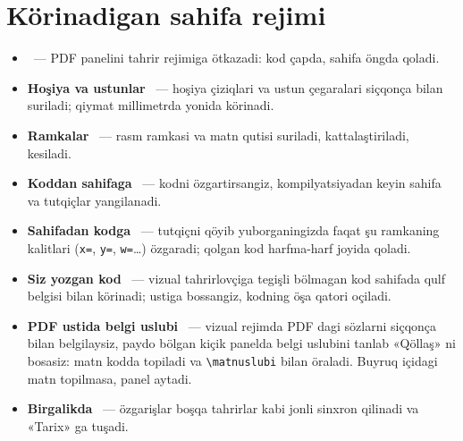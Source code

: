 \section{Körinadigan sahifa rejimi}\label{sec:sd-vizual}
\begin{itemize}
\item \textbf{} \beta\ --- PDF panelini tahrir rejimiga ötkazadi: kod çapda, sahifa öngda qoladi.
\item \textbf{Hoşiya va ustunlar} \beta\ --- hoşiya çiziqlari va ustun çegaralari siçqonça bilan suriladi; qiymat millimetrda yonida körinadi.
\item \textbf{Ramkalar} \beta\ --- rasm ramkasi va matn qutisi suriladi, kattalaştiriladi, kesiladi.
\item \textbf{Koddan sahifaga} \beta\ --- kodni özgartirsangiz, kompilyatsiyadan keyin sahifa va tutqiçlar yangilanadi.
\item \textbf{Sahifadan kodga} \beta\ --- tutqiçni qöyib yuborganingizda faqat şu ramkaning kalitlari (\texttt{x=}, \texttt{y=}, \texttt{w=}\ldots) özgaradi; qolgan kod harfma-harf joyida qoladi.
\item \textbf{Siz yozgan kod} \beta\ --- vizual tahrirlovçiga tegişli bölmagan kod sahifada qulf belgisi bilan körinadi; ustiga bossangiz, kodning öşa qatori oçiladi.
\item \textbf{PDF ustida belgi uslubi} \beta\ --- vizual rejimda PDF dagi sözlarni siçqonça bilan belgilaysiz, paydo bölgan kiçik panelda belgi uslubini tanlab «Qöllaş» ni bosasiz: matn kodda topiladi va \texttt{\textbackslash matnuslubi} bilan öraladi. Buyruq içidagi matn topilmasa, panel aytadi.
\item \textbf{Birgalikda} \beta\ --- özgarişlar boşqa tahrirlar kabi jonli sinxron qilinadi va «Tarix» ga tuşadi.
\end{itemize}

